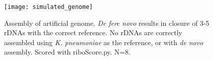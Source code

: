 \begin{figure}[]
    \centering
    \hspace*{0cm}\texttt{[image: simulated\_genome]}
    \caption{Assembly of artificial genome. \textit{De fere novo} results in closure of 3-5 rDNAs with the correct reference. No rDNAs are correctly assembled using \textit{K. pneumoniae} as the reference, or with \textit{de novo} assembly. Scored with riboScore.py. N=8.}
    \label{fig:simgenome}
\end{figure}
